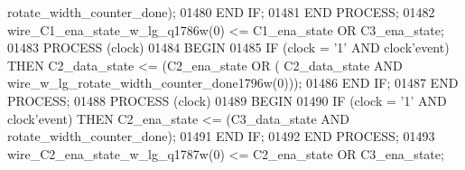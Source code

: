 \begin{DoxyCode}
{{      rotate_width_counter_done}\textcolor{vhdlchar}{)};
01480         \textcolor{keywordflow}{END} \textcolor{keywordflow}{IF};
01481     \textcolor{keywordflow}{END} \textcolor{keywordflow}{PROCESS};
01482     \textcolor{vhdlchar}{wire_C1_ena_state_w_lg_q1786w}\textcolor{vhdlchar}{(}\textcolor{vhdllogic}{}\textcolor{vhdllogic}{0}\textcolor{vhdlchar}{)} \textcolor{vhdlchar}{<=} \textcolor{vhdlchar}{C1_ena_state} \textcolor{keywordflow}{OR} \textcolor{vhdlchar}{C3_ena_state};
01483     \textcolor{keywordflow}{PROCESS} (clock)
01484 \textcolor{vhdlkeyword}{    BEGIN}
01485         \textcolor{keywordflow}{IF} \textcolor{vhdlchar}{(}\textcolor{vhdlchar}{clock} \textcolor{vhdlchar}{=} \textcolor{vhdlchar}{'}\textcolor{vhdllogic}{}\textcolor{vhdllogic}{1}\textcolor{vhdlchar}{'} \textcolor{keywordflow}{AND} \textcolor{vhdlchar}{clock}\textcolor{vhdlchar}{'}\textcolor{vhdlkeyword}{event}\textcolor{vhdlchar}{)} \textcolor{keywordflow}{THEN} \textcolor{vhdlchar}{C2_data_state} \textcolor{vhdlchar}{<=} \textcolor{vhdlchar}{(}\textcolor{vhdlchar}{C2_ena_state} \textcolor{keywordflow}{OR} \textcolor{vhdlchar}{(}\textcolor{vhdlchar}{
      C2_data_state} \textcolor{keywordflow}{AND} \textcolor{vhdlchar}{wire_w_lg_rotate_width_counter_done1796w}\textcolor{vhdlchar}{(}\textcolor{vhdllogic}{}\textcolor{vhdllogic}{0}\textcolor{vhdlchar}{)}\textcolor{vhdlchar}{)}\textcolor{vhdlchar}{)};
01486         \textcolor{keywordflow}{END} \textcolor{keywordflow}{IF};
01487     \textcolor{keywordflow}{END} \textcolor{keywordflow}{PROCESS};
01488     \textcolor{keywordflow}{PROCESS} (clock)
01489 \textcolor{vhdlkeyword}{    BEGIN}
01490         \textcolor{keywordflow}{IF} \textcolor{vhdlchar}{(}\textcolor{vhdlchar}{clock} \textcolor{vhdlchar}{=} \textcolor{vhdlchar}{'}\textcolor{vhdllogic}{}\textcolor{vhdllogic}{1}\textcolor{vhdlchar}{'} \textcolor{keywordflow}{AND} \textcolor{vhdlchar}{clock}\textcolor{vhdlchar}{'}\textcolor{vhdlkeyword}{event}\textcolor{vhdlchar}{)} \textcolor{keywordflow}{THEN} \textcolor{vhdlchar}{C2_ena_state} \textcolor{vhdlchar}{<=} \textcolor{vhdlchar}{(}\textcolor{vhdlchar}{C3_data_state} \textcolor{keywordflow}{AND} \textcolor{vhdlchar}{
      rotate_width_counter_done}\textcolor{vhdlchar}{)};
01491         \textcolor{keywordflow}{END} \textcolor{keywordflow}{IF};
01492     \textcolor{keywordflow}{END} \textcolor{keywordflow}{PROCESS};
01493     \textcolor{vhdlchar}{wire_C2_ena_state_w_lg_q1787w}\textcolor{vhdlchar}{(}\textcolor{vhdllogic}{}\textcolor{vhdllogic}{0}\textcolor{vhdlchar}{)} \textcolor{vhdlchar}{<=} \textcolor{vhdlchar}{C2_ena_state} \textcolor{keywordflow}{OR} \textcolor{vhdlchar}{C3_ena_state};
}
\end{DoxyCode}
